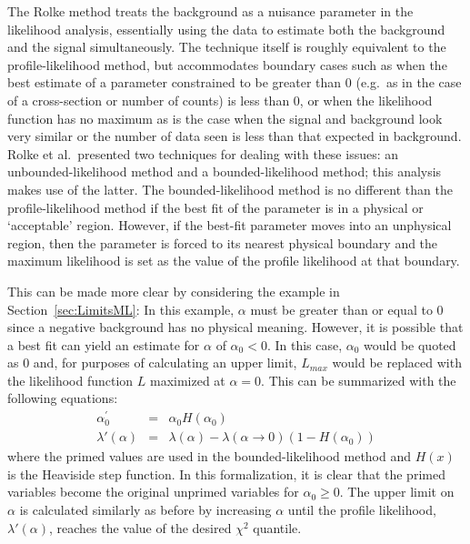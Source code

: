 The Rolke method treats the background as a nuisance parameter in the likelihood analysis, essentially using the data to estimate both the background and the signal simultaneously.  The technique itself is roughly equivalent to the profile-likelihood method, but accommodates boundary cases such as when the best estimate of a parameter constrained to be greater than 0 (e.g.~as in the case of a cross-section or number of counts) is less than 0, or when the likelihood function has no maximum as is the case when the signal and background look very similar or the number of data seen is less than that expected in background.  Rolke et al.~presented two techniques for dealing with these issues: an unbounded-likelihood method and a bounded-likelihood method; this analysis makes use of the latter.  The bounded-likelihood method is no different than the profile-likelihood method if the best fit of the parameter is in a physical or `acceptable' region.  However, if the best-fit parameter moves into an unphysical region, then the parameter is forced to its nearest physical boundary and the maximum likelihood is set as the value of the profile likelihood at that boundary.  

This can be made more clear by considering the example in Section~\ref{sec:LimitsML}:  In this example, $\alpha$ must be greater than or equal to 0 since a negative background has no physical meaning.  However, it is possible that a best fit can yield an estimate for $\alpha$ of $\alpha_{0}<0$.  In this case, $\alpha_{0}$ would be quoted as 0 and, for purposes of calculating an upper limit, $L_{max}$ would be replaced with the likelihood function $L$ maximized at $\alpha = 0$.  This can be summarized with the following equations:
		\begin{equation}
			\begin{array}{rcl}
				\alpha_0^{\prime} & = & \alpha_0 H (\alpha_0) \\
				\lambda' (\alpha) & = & \lambda(\alpha) - \lambda(\alpha \to 0) (1 - H(\alpha_0))
			\end{array}
		\end{equation}
where the primed values are used in the bounded-likelihood method and $H(x)$ is the Heaviside step function.  In this formalization, it is clear that the primed variables become the original unprimed variables for $\alpha_{0}\geq0$.  The upper limit on $\alpha$ is calculated similarly as before by increasing $\alpha$ until the profile likelihood, $\lambda'(\alpha)$, reaches the value of the desired $\chi^{2}$ quantile. 

